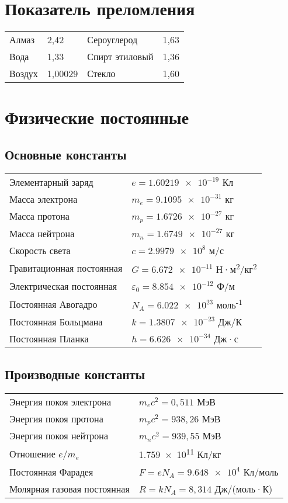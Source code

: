 \documentclass[a4paper,12pt]{article}
\begin{document}
\section*{Показатель преломления}
\begin{tabular}{@{}llll@{}}
\toprule
Алмаз & 2,42 & Сероуглерод & 1,63 \\
Вода & 1,33 & Спирт этиловый & 1,36 \\
Воздух & 1,00029 & Стекло & 1,60 \\
\bottomrule
\end{tabular}

\section*{Физические постоянные}

\subsection*{Основные константы}
\begin{tabular}{@{}ll@{}}
\toprule
Элементарный заряд & $e = \num{1,60219e-19}$ Кл \\
Масса электрона & $m_e = \num{9,1095e-31}$ кг \\
Масса протона & $m_p = \num{1,6726e-27}$ кг \\
Масса нейтрона & $m_n = \num{1,6749e-27}$ кг \\
Скорость света & $c = \num{2,9979e8}$ м/с \\
Гравитационная постоянная & $G = \num{6,672e-11}$ Н·м\textsuperscript{2}/кг\textsuperscript{2} \\
Электрическая постоянная & $\varepsilon_0 = \num{8,854e-12}$ Ф/м \\
Постоянная Авогадро & $N_A = \num{6,022e23}$ моль\textsuperscript{-1} \\
Постоянная Больцмана & $k = \num{1,3807e-23}$ Дж/К \\
Постоянная Планка & $h = \num{6,626e-34}$ Дж·с \\
\bottomrule
\end{tabular}

\subsection*{Производные константы}
\begin{tabular}{@{}ll@{}}
\toprule
Энергия покоя электрона & $m_ec^2 = 0,511$ МэВ \\
Энергия покоя протона & $m_pc^2 = 938,26$ МэВ \\
Энергия покоя нейтрона & $m_nc^2 = 939,55$ МэВ \\
Отношение $e/m_e$ & \num{1,759e11} Кл/кг \\
Постоянная Фарадея & $F = eN_A = \num{9,648e4}$ Кл/моль \\
Молярная газовая постоянная & $R = kN_A = 8,314$ Дж/(моль·К) \\
\bottomrule
\end{tabular}
\end{document}
